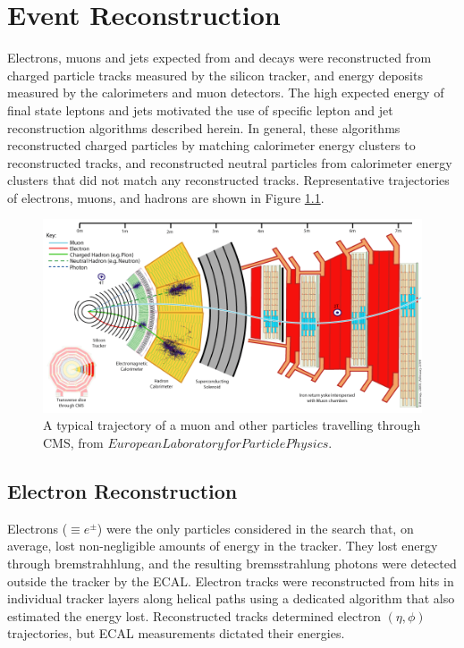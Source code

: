 \chapter{Event Reconstruction}
\label{sec:reco_chapter}

Electrons, muons and jets expected from \WR and \nul decays were reconstructed from charged particle 
tracks measured by the silicon tracker, and energy deposits measured by the calorimeters and muon 
detectors.  The high expected energy of final state leptons and jets motivated the use of specific 
lepton and jet reconstruction algorithms described herein.  In general, these algorithms reconstructed 
charged particles by matching calorimeter energy clusters to reconstructed tracks, and reconstructed 
neutral particles from calorimeter energy clusters that did not match any reconstructed tracks.  
Representative trajectories of electrons, muons, and hadrons are shown in Figure \ref{fig:particleTrajectories}.

\begin{figure}[h]
	\centering
	\includegraphics[width=1.0\textwidth]{figures/flowOfParticlesThroughCMS.gif}
	\caption{A typical trajectory of a muon and other particles travelling through CMS, from $European Laboratory for Particle Physics$.}
	\label{fig:particleTrajectories}
\end{figure}


\section{Electron Reconstruction}
\label{sec:eleReco}
Electrons ($\equiv e^{\pm}$) were the only particles considered in the \WR search that, on average, lost non-negligible 
amounts of energy in the tracker.  They lost energy through bremstrahhlung, and the resulting bremsstrahlung 
photons were detected outside the tracker by the ECAL.  Electron tracks were reconstructed from hits in 
individual tracker layers along helical paths using a dedicated algorithm that also estimated the energy lost.  
Reconstructed tracks determined electron $(\eta, \phi)$ trajectories, but ECAL measurements dictated their 
energies.

